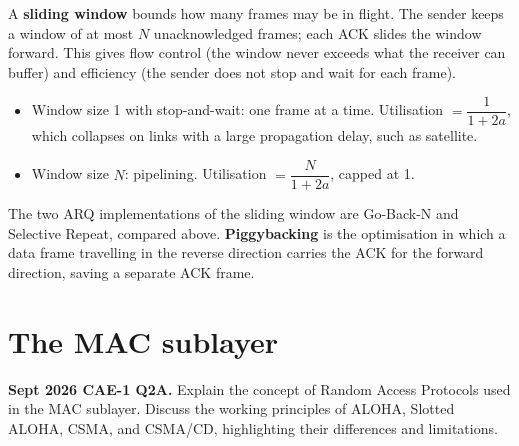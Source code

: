 \documentclass[11pt,a4paper]{article}
\begin{document}
\begin{solbox}
A \textbf{sliding window} bounds how many frames may be in flight. The sender keeps a window of at most $N$ unacknowledged frames; each ACK slides the window forward. This gives flow control (the window never exceeds what the receiver can buffer) and efficiency (the sender does not stop and wait for each frame).

\begin{itemize}
\item Window size 1 with stop-and-wait: one frame at a time. Utilisation $= \dfrac{1}{1+2a}$, which collapses on links with a large propagation delay, such as satellite.
\item Window size $N$: pipelining. Utilisation $= \dfrac{N}{1+2a}$, capped at 1.
\end{itemize}

The two ARQ implementations of the sliding window are Go-Back-N and Selective Repeat, compared above. \textbf{Piggybacking} is the optimisation in which a data frame travelling in the reverse direction carries the ACK for the forward direction, saving a separate ACK frame.
\end{solbox}

\section{The MAC sublayer}

\begin{pyqbox}
\textbf{Sept 2026 CAE-1 Q2A.} Explain the concept of Random Access Protocols used in the MAC sublayer. Discuss the working principles of ALOHA, Slotted ALOHA, CSMA, and CSMA/CD, highlighting their differences and limitations.
\end{pyqbox}
\end{document}
